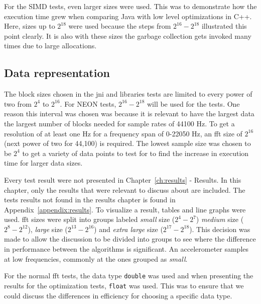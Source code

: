 For the SIMD tests, even larger sizes were used. This was to demonstrate how the execution time grew when comparing Java with low level optimizations in C++. Here, sizes up to $2^{18}$ were used because the steps from $2^{16} - 2^{18}$ illustrated this point clearly. It is also with these sizes the garbage collection gets invoked many times due to large allocations.

\subsection{Data representation}
The block sizes chosen in the \gls{jni} and libraries tests are limited to every power of two from $2^4$ to $2^{16}$. For NEON tests, $2^{16} - 2^{18}$ will be used for the tests. One reason this interval was chosen was because it is relevant to have the largest data the largest number of blocks needed for sample rates of 44100 Hz. To get a resolution of at least one Hz for a frequency span of 0-22050 Hz, an \gls{fft} size of $2^{16}$ (next power of two for 44,100) is required. The lowest sample size was chosen to be $2^{4}$ to get a variety of data points to test for to find the increase in execution time for larger data sizes.

Every test result were not presented in Chapter~\ref{ch:results} - Results. In this chapter, only the results that were relevant to discuss about are included. The tests results not found in the results chapter is found in Appendix~\ref{appendix:results}. To visualize a result, tables and line graphs were used. \gls{fft} sizes were split into groups labeled \emph{small} size ($2^{4} - 2^{7}$) \emph{medium} size ($2^{8} - 2^{12}$), \emph{large} size ($2^{13} - 2^{16}$) and \emph{extra large} size ($2^{17} - 2^{18}$). This decision was made to allow the discussion to be divided into groups to see where the difference in performance between the algorithms is significant. An accelerometer samples at low frequencies, commonly at the ones grouped as \emph{small}.

For the normal \gls{fft} tests, the data type \texttt{double} was used and when presenting the results for the optimization tests, \texttt{float} was used. This was to ensure that we could discuss the differences in efficiency for choosing a specific data type.

